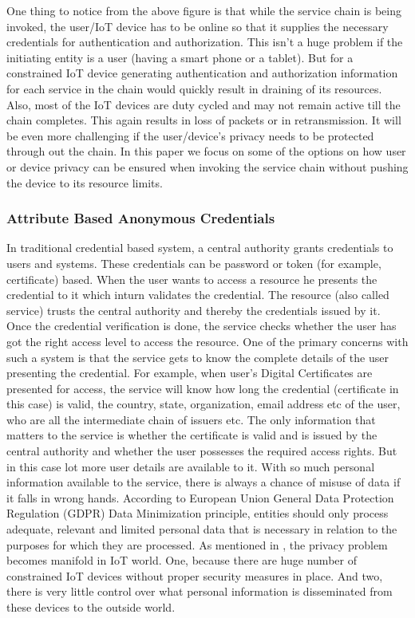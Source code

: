 \documentclass[journal]{IEEEtran}
\begin{document}
One thing to notice from the above figure is that while the service chain is being invoked, the user/IoT device has to be online so that it supplies the necessary credentials for authentication and authorization.  This isn't a huge problem if the initiating entity is a user (having a smart phone or a tablet). But for a constrained IoT device generating authentication and authorization information for each service in the chain would quickly result in draining of its resources. Also, most of the IoT devices are duty cycled and may not remain active till the chain completes. This again results in loss of packets or in retransmission. It will be even more challenging if the user/device's privacy needs to be protected through out the chain. In this paper we focus on some of the options on how user or device privacy can be ensured when invoking the service chain without pushing the device to its resource limits.

\subsubsection{Attribute Based Anonymous Credentials}
In traditional credential based system, a central authority grants credentials to users and systems. These credentials can be password or token (for example, certificate) based. When the user wants to access a resource he presents the credential to it which inturn validates the credential. The resource (also called service) trusts the central authority and thereby the credentials issued by it. Once the credential verification is done, the service checks whether the user has got the right access level to access the resource. One of the primary concerns with such a system is that the service gets to know the complete details of the user presenting the credential. For example, when user's Digital Certificates are presented for access, the service will know how long the credential (certificate in this case) is valid, the country, state, organization, email address etc of the user, who are all the intermediate chain of issuers etc. The only information that matters to the service is whether the certificate is valid and is issued by the central authority and whether the user possesses the required access rights. But in this case lot more user details are available to it. With so much personal information available to the service, there is always a chance of misuse of data if it falls in wrong hands. According to European Union General Data Protection Regulation (GDPR) Data Minimization principle, entities should only process adequate, relevant and limited personal data that is necessary in relation to the purposes for which they are processed. As mentioned in \cite{Ziegeldorf2014PrivacyIT}, the privacy problem becomes manifold in IoT world. One, because there are huge number of constrained IoT devices without proper security measures in place. And two, there is very little control over what personal information is disseminated from these devices to the outside world.
\end{document}
